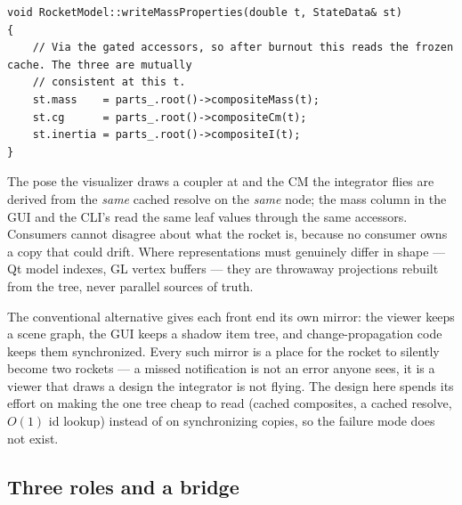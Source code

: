 \begin{listing}[htbp]
\begin{verbatim}
void RocketModel::writeMassProperties(double t, StateData& st)
{
    // Via the gated accessors, so after burnout this reads the frozen cache. The three are mutually
    // consistent at this t.
    st.mass    = parts_.root()->compositeMass(t);
    st.cg      = parts_.root()->compositeCm(t);
    st.inertia = parts_.root()->compositeI(t);
}
\end{verbatim}
\caption{The model side of the sim bridge delegates every mass property to the root node's cached
composite queries (). The integrator flies whatever the
tree says --- there is no second bookkeeping of mass anywhere in the sim path.}
\label{lst:intro-massprops}
\end{listing}

\begin{keyinsight}
The pose the visualizer draws a coupler at and the CM the integrator flies are derived from the
\emph{same} cached resolve on the \emph{same} node; the mass column in the GUI and the CLI's
 read the same leaf values through the same  accessors. Consumers
cannot disagree about what the rocket is, because no consumer owns a copy that could drift. Where
representations must genuinely differ in shape --- Qt model indexes, GL vertex buffers --- they are
throwaway projections rebuilt from the tree, never parallel sources of truth.
\end{keyinsight}

\begin{rejected}
The conventional alternative gives each front end its own mirror: the viewer keeps a scene graph,
the GUI keeps a shadow item tree, and change-propagation code keeps them synchronized. Every such
mirror is a place for the rocket to silently become two rockets --- a missed notification is not an
error anyone sees, it is a viewer that draws a design the integrator is not flying. The design here
spends its effort on making the one tree cheap to read (cached composites, a cached resolve,
$O(1)$ id lookup) instead of on synchronizing copies, so the failure mode does not exist.
\end{rejected}

\subsection{Three roles and a bridge}\label{sec:intro-roles}

